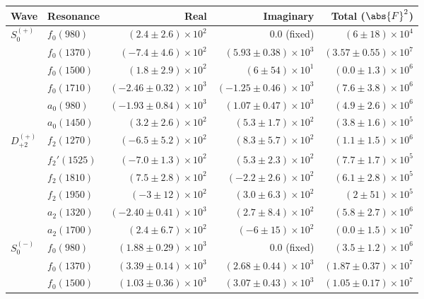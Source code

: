 \begin{table}[h]
    \begin{center}
        \begin{tabular}{llrrr}\toprule
        Wave & Resonance & Real & Imaginary & Total ($\abs{F}^2$) \\\midrule
$S_{0}^{(+)}$ & $f_{0}(980)$ & $(2.4 \pm 2.6) \times 10^{2}$ & $0.0$ (fixed) & $(6 \pm 18) \times 10^{4}$ \\
 & $f_{0}(1370)$ & $(-7.4 \pm 4.6) \times 10^{2}$ & $(5.93 \pm 0.38) \times 10^{3}$ & $(3.57 \pm 0.55) \times 10^{7}$ \\
 & $f_{0}(1500)$ & $(1.8 \pm 2.9) \times 10^{2}$ & $(6 \pm 54) \times 10^{1}$ & $(0.0 \pm 1.3) \times 10^{6}$ \\
 & $f_{0}(1710)$ & $(-2.46 \pm 0.32) \times 10^{3}$ & $(-1.25 \pm 0.46) \times 10^{3}$ & $(7.6 \pm 3.8) \times 10^{6}$ \\
 & $a_{0}(980)$ & $(-1.93 \pm 0.84) \times 10^{3}$ & $(1.07 \pm 0.47) \times 10^{3}$ & $(4.9 \pm 2.6) \times 10^{6}$ \\
 & $a_{0}(1450)$ & $(3.2 \pm 2.6) \times 10^{2}$ & $(5.3 \pm 1.7) \times 10^{2}$ & $(3.8 \pm 1.6) \times 10^{5}$ \\
$D_{+2}^{(+)}$ & $f_{2}(1270)$ & $(-6.5 \pm 5.2) \times 10^{2}$ & $(8.3 \pm 5.7) \times 10^{2}$ & $(1.1 \pm 1.5) \times 10^{6}$ \\
 & $f_{2}'(1525)$ & $(-7.0 \pm 1.3) \times 10^{2}$ & $(5.3 \pm 2.3) \times 10^{2}$ & $(7.7 \pm 1.7) \times 10^{5}$ \\
 & $f_{2}(1810)$ & $(7.5 \pm 2.8) \times 10^{2}$ & $(-2.2 \pm 2.6) \times 10^{2}$ & $(6.1 \pm 2.8) \times 10^{5}$ \\
 & $f_{2}(1950)$ & $(-3 \pm 12) \times 10^{2}$ & $(3.0 \pm 6.3) \times 10^{2}$ & $(2 \pm 51) \times 10^{5}$ \\
 & $a_{2}(1320)$ & $(-2.40 \pm 0.41) \times 10^{3}$ & $(2.7 \pm 8.4) \times 10^{2}$ & $(5.8 \pm 2.7) \times 10^{6}$ \\
 & $a_{2}(1700)$ & $(2.4 \pm 6.7) \times 10^{2}$ & $(-6 \pm 15) \times 10^{2}$ & $(0.0 \pm 1.5) \times 10^{7}$ \\
$S_{0}^{(-)}$ & $f_{0}(980)$ & $(1.88 \pm 0.29) \times 10^{3}$ & $0.0$ (fixed) & $(3.5 \pm 1.2) \times 10^{6}$ \\
 & $f_{0}(1370)$ & $(3.39 \pm 0.14) \times 10^{3}$ & $(2.68 \pm 0.44) \times 10^{3}$ & $(1.87 \pm 0.37) \times 10^{7}$ \\
 & $f_{0}(1500)$ & $(1.03 \pm 0.36) \times 10^{3}$ & $(3.07 \pm 0.43) \times 10^{3}$ & $(1.05 \pm 0.17) \times 10^{7}$ \\

\end{tabular}
\end{center}
\end{table}
